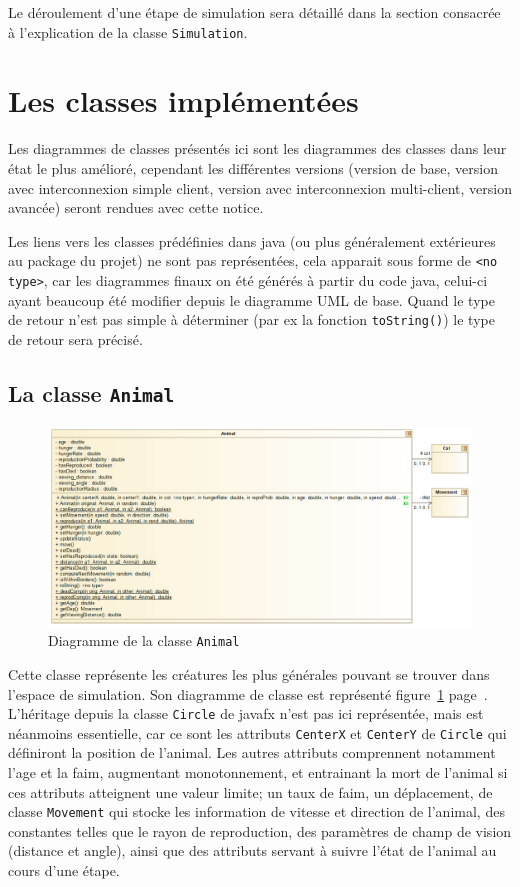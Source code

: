 \documentclass[12pt,a4paper,titlepage]{article}
\begin{document}
Le déroulement d'une étape de simulation sera détaillé dans la section consacrée à l'explication de la classe 
\texttt{Simulation}.
\section{Les classes implémentées}
Les diagrammes de classes présentés ici sont les diagrammes des classes dans leur état le plus amélioré, 
cependant les différentes versions (version de base, version avec interconnexion simple client, version avec 
interconnexion multi-client, version avancée) seront rendues avec cette notice.

Les liens vers les classes prédéfinies dans java (ou plus généralement extérieures au package du projet) ne sont pas représentées, cela apparait sous forme de \texttt{<no type>}, car les diagrammes finaux on été générés à partir du code java, celui-ci ayant beaucoup été modifier depuis le diagramme UML de base. Quand le type de retour n'est pas simple à déterminer (par ex la fonction \texttt{toString()}) le type de retour sera précisé.


\subsection{La classe \texttt{Animal}}
\FloatBarrier
\begin{figure}[h]
\includegraphics[width = \textwidth]{"../diagrammes/Animal"}
\caption{Diagramme de la classe \texttt{Animal}}
\label{Animal}
\end{figure}

Cette classe représente les créatures les plus générales pouvant se trouver dans l'espace de simulation. Son 
diagramme de classe est représenté figure~\ref{Animal} page~\pageref{Animal}. 
L'héritage depuis la classe \texttt{Circle} de javafx n'est pas ici représentée, mais est néanmoins 
essentielle, car ce sont les attributs \texttt{CenterX} et \texttt{CenterY} de \texttt{Circle} qui définiront 
la position de l'animal. Les autres attributs comprennent notamment l'age et la faim, augmentant 
monotonnement, et entrainant la mort de l'animal si ces attributs atteignent une valeur limite; un taux de 
faim, un déplacement, de classe \texttt{Movement} qui stocke les information de vitesse et direction de 
l'animal, des constantes telles que le rayon de reproduction, des paramètres de champ de vision (distance et 
angle), ainsi que des attributs servant à suivre l'état de l'animal au cours d'une étape.
\end{document}
